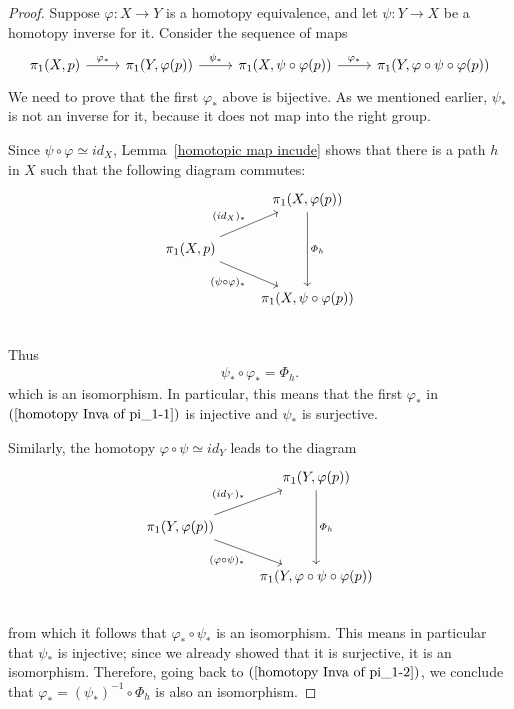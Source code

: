 \begin{proof}
Suppose $\varphi:X\to Y$ is a homotopy equivalence, and let $\psi:Y\to X$ be a homotopy inverse for it. Consider the sequence of maps
\begin{equation}\label{homotopy Inva of pi_1-1}
\begin{tikzcd}\pi_1(X,p)\ar[r,"\varphi_*"]&\pi_1(Y,\varphi(p))\ar[r,"\psi_*"]&\pi_1(X,\psi\circ\varphi(p))\ar[r,"\varphi_*"]&\pi_1(Y,\varphi\circ\psi\circ\varphi(p))
\end{tikzcd}
\end{equation}
We need to prove that the first $\varphi_*$ above is bijective. As we mentioned earlier, $\psi_*$ is not an inverse for it, because it does not map into the right group.\par
Since $\psi\circ\varphi\simeq id_X$, Lemma~\ref{homotopic map incude} shows that there is a path $h$ in $X$ such that the following diagram commutes:
\[\begin{tikzcd}
&\pi_1(X,\varphi(p))\ar[dd,"\varPhi_h"]\\
\pi_1(X,p)\ar[ru,"(id_X)_*"]\ar[rd,swap,"(\psi\circ\varphi)_*"]&\\
&\pi_1(X,\psi\circ\varphi(p))\\
\end{tikzcd}\]
Thus
\begin{align}\label{homotopy Inva of pi_1-2}
\psi_*\circ\varphi_*=\varPhi_h.
\end{align}
which is an isomorphism. In particular, this means that the first $\varphi_*$ in $(\ref{homotopy Inva of pi_1-1})$ is injective and $\psi_*$ is surjective.\par
Similarly, the homotopy $\varphi\circ\psi\simeq id_Y$ leads to the diagram
\[\begin{tikzcd}
&\pi_1(Y,\varphi(p))\ar[dd,"\varPhi_h"]\\
\pi_1(Y,\varphi(p))\ar[ru,"(id_Y)_*"]\ar[rd,swap,"(\varphi\circ\psi)_*"]&\\
&\pi_1(Y,\varphi\circ\psi\circ\varphi(p))\\
\end{tikzcd}\]
from which it follows that $\varphi_*\circ\psi_*$ is an isomorphism. This means in particular that $\psi_*$ is injective; since we already showed that it
is surjective, it is an isomorphism. Therefore, going back to $(\ref{homotopy Inva of pi_1-2})$, we conclude that $\varphi_*=(\psi_*)^{-1}\circ\varPhi_h$ is also an isomorphism.
\end{proof}
